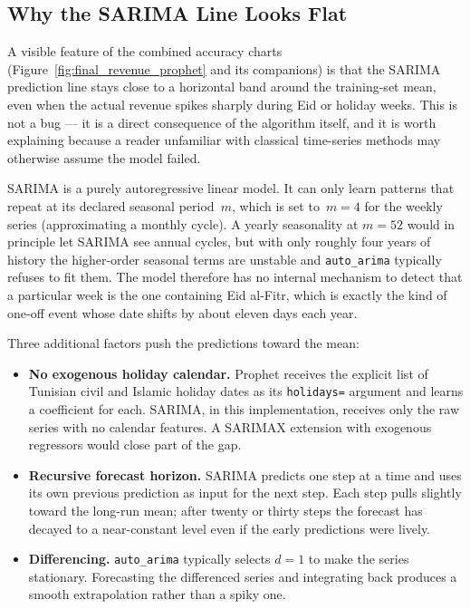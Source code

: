 \subsection{Why the SARIMA Line Looks Flat}

A visible feature of the combined accuracy charts (Figure~\ref{fig:final_revenue_prophet}
and its companions) is that the SARIMA prediction line stays close to a horizontal
band around the training-set mean, even when the actual revenue spikes sharply during
Eid or holiday weeks. This is not a bug --- it is a direct consequence of the algorithm
itself, and it is worth explaining because a reader unfamiliar with classical time-series
methods may otherwise assume the model failed.

SARIMA is a purely autoregressive linear model. It can only learn patterns that repeat
at its declared seasonal period~$m$, which is set to~$m=4$ for the weekly series
(approximating a monthly cycle). A yearly seasonality at $m=52$ would in principle let
SARIMA see annual cycles, but with only roughly four years of history the higher-order
seasonal terms are unstable and \texttt{auto\_arima} typically refuses to fit them.
The model therefore has no internal mechanism to detect that a particular week is the
one containing Eid al-Fitr, which is exactly the kind of one-off event whose date
shifts by about eleven days each year.

Three additional factors push the predictions toward the mean:

\begin{itemize}
  \item \textbf{No exogenous holiday calendar.} Prophet receives the explicit list of
        Tunisian civil and Islamic holiday dates as its \texttt{holidays=} argument and
        learns a coefficient for each. SARIMA, in this implementation, receives only
        the raw series with no calendar features. A SARIMAX extension with exogenous
        regressors would close part of the gap.
  \item \textbf{Recursive forecast horizon.} SARIMA predicts one step at a time and uses
        its own previous prediction as input for the next step. Each step pulls slightly
        toward the long-run mean; after twenty or thirty steps the forecast has decayed
        to a near-constant level even if the early predictions were lively.
  \item \textbf{Differencing.} \texttt{auto\_arima} typically selects $d=1$ to make the
        series stationary. Forecasting the differenced series and integrating back
        produces a smooth extrapolation rather than a spiky one.
\end{itemize}

